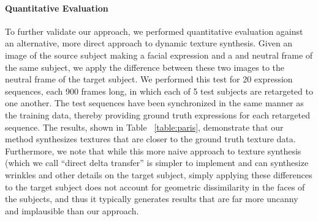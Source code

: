 \paragraph{Quantitative Evaluation}

To further validate our approach, we performed quantitative evaluation against an alternative, more direct approach to dynamic texture synthesis. Given an image of the source subject making a facial expression and a and neutral frame of the same subject, we apply the difference between these two images to the neutral frame of the target subject. We performed this test for 20 expression sequences, each 900 frames long, in which each of 5 test subjects are retargeted to one another. The test sequences have been synchronized in the same manner as the training data, thereby providing ground truth expressions for each retargeted sequence. The results, shown in Table ~\ref{table:paris}, demonstrate that our method synthesizes textures that are closer to the ground truth texture data. Furthermore, we note that while this more naive approach to texture synthesis (which we call ``direct delta transfer'' is simpler to implement and can synthesize wrinkles and other details on the target subject, simply applying these differences to the target subject does not account for geometric dissimilarity in the faces of the subjects, and thus it typically generates results that are far more uncanny and implausible than our approach.




